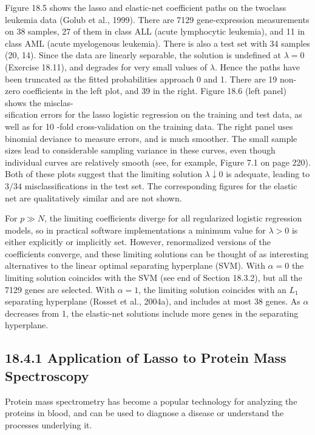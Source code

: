 \documentclass[10pt]{article}
\begin{document}
Figure 18.5 shows the lasso and elastic-net coefficient paths on the twoclass leukemia data (Golub et al., 1999). There are 7129 gene-expression measurements on 38 samples, 27 of them in class ALL (acute lymphocytic leukemia), and 11 in class AML (acute myelogenous leukemia). There is also a test set with 34 samples (20, 14). Since the data are linearly separable, the solution is undefined at $\lambda=0$ (Exercise 18.11), and degrades for very small values of $\lambda$. Hence the paths have been truncated as the fitted probabilities approach 0 and 1. There are 19 non-zero coefficients in the left plot, and 39 in the right. Figure 18.6 (left panel) shows the misclas-\\
sification errors for the lasso logistic regression on the training and test data, as well as for 10 -fold cross-validation on the training data. The right panel uses binomial deviance to measure errors, and is much smoother. The small sample sizes lead to considerable sampling variance in these curves, even though individual curves are relatively smooth (see, for example, Figure 7.1 on page 220). Both of these plots suggest that the limiting solution $\lambda \downarrow 0$ is adequate, leading to $3 / 34$ misclassifications in the test set. The corresponding figures for the elastic net are qualitatively similar and are not shown.

For $p \gg N$, the limiting coefficients diverge for all regularized logistic regression models, so in practical software implementations a minimum value for $\lambda>0$ is either explicitly or implicitly set. However, renormalized versions of the coefficients converge, and these limiting solutions can be thought of as interesting alternatives to the linear optimal separating hyperplane (SVM). With $\alpha=0$ the limiting solution coincides with the SVM (see end of Section 18.3.2), but all the 7129 genes are selected. With $\alpha=1$, the limiting solution coincides with an $L_{1}$ separating hyperplane (Rosset et al., 2004a), and includes at most 38 genes. As $\alpha$ decreases from 1, the elastic-net solutions include more genes in the separating hyperplane.

\subsection*{18.4.1 Application of Lasso to Protein Mass Spectroscopy}
Protein mass spectrometry has become a popular technology for analyzing the proteins in blood, and can be used to diagnose a disease or understand the processes underlying it.
\end{document}
